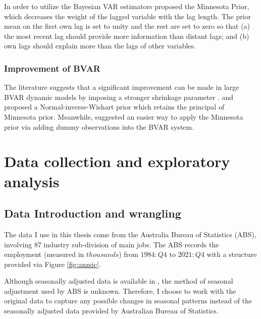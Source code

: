 \documentclass{monashthesis}
\begin{document}
In order to utilize the Bayesian VAR estimators \textcite{litterman1979} proposed the Minnesota Prior, which decreases the weight of the lagged variable with the lag length. The prior mean on the first own lag is set to unity and the rest are set to zero so that (a) the most recent lag should provide more information than distant lags; and (b) own lags should explain more than the lags of other variables.

\hypertarget{improvement-of-bvar}{%
\subsection{Improvement of BVAR}\label{improvement-of-bvar}}

The literature suggests that a significant improvement can be made in large BVAR dynamic models by imposing a stronger shrinkage parameter \autocite{banbura2010large,litterman1986}. \textcite{robertson1999vector} and \textcite{kadiyala1997} proposed a Normal-inverse-Wishart prior which retains the principal of Minnesota prior. Meanwhile, \textcite{banbura2010large} suggested an easier way to apply the Minnesota prior via adding dummy observations into the BVAR system.

\hypertarget{data-collection-and-exploratory-analysis}{%
\chapter{Data collection and exploratory analysis}\label{data-collection-and-exploratory-analysis}}

\hypertarget{data-introduction-and-wrangling}{%
\section{Data Introduction and wrangling}\label{data-introduction-and-wrangling}}

The data I use in this thesis come from the Australia Bureau of Statistics (ABS), involving 87 industry sub-division of main jobs. The ABS records the employment (measured in \(thousands\)) from \(1984:Q4\) to \(2021:Q4\) with a structure provided via Figure \ref{fig:anzsic}.

Although seasonally adjusted data is available in \autocite{ABS2022}, the method of seasonal adjustment used by ABS is unknown. Therefore, I choose to work with the original data to capture any possible changes in seasonal patterns instead of the seasonally adjusted data provided by Australian Bureau of Statistics.
\end{document}
